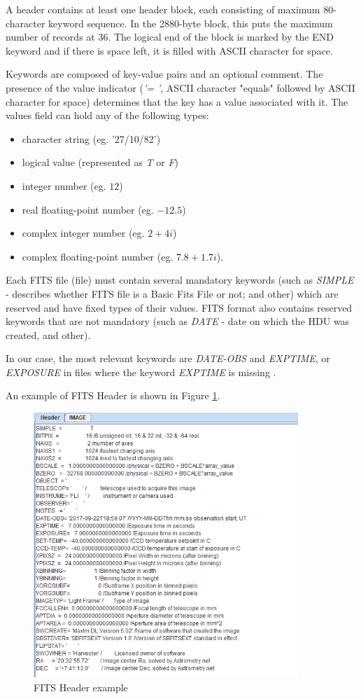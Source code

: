 	A header contains at least one header block, each consisting of maximum 80-character keyword sequence. In the 2880-byte block, this puts the maximum number of records at 36. The logical end of the block is marked by the END keyword and if there is space left, it is filled with ASCII character for space.
	
	Keywords are composed of key-value pairs and an optional comment. The presence of the value indicator (\emph{'= '}, ASCII character "equals" followed by ASCII character for space) determines that the key has a value associated with it. The values field can hold any of the following types:
	
	\begin{itemize}
		\item character string (eg. '27/10/82')
		\item logical value (represented as \emph{T} or \emph{F})
		\item integer number (eg. $12$)
		\item real floating-point number (eg. $-12.5$)
		\item complex integer number (eg. $2+4i$)
		\item complex floating-point number (eg. $7.8+1.7i$).
	\end{itemize}
	
	 Each FITS file (file) must contain several mandatory keywords (such as \emph{SIMPLE} - describes whether FITS file is a Basic Fits File or not; and other) which are reserved and have fixed types of their values. FITS format also contains reserved keywords that are not mandatory (such as \emph{DATE} - date on which the HDU was created, and other).
	 
	 In our case, the most relevant keywords are \emph{DATE-OBS} and \emph{EXPTIME}, or \emph{EXPOSURE} in files where the keyword \emph{EXPTIME} is missing \citep{FITSdefinition}.
	 
	 An example of FITS Header is shown in Figure \ref{fig:fits_header}.
	
	\begin{figure}[H]
	\centering
	  \includegraphics[width=10cm]{images/fits_header_example}
		  \caption{FITS Header example}
	  \label{fig:fits_header}
	\end{figure}

